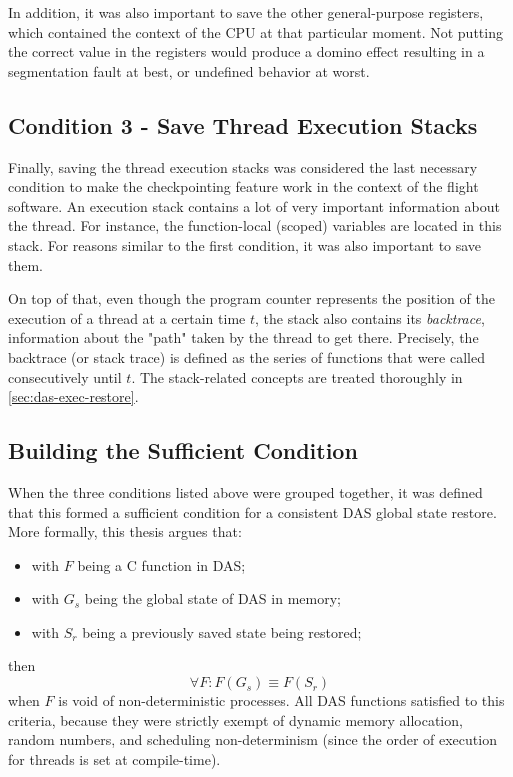 {In addition, it was also important to save the other general-purpose registers, which contained the context of the CPU at that particular moment. Not putting the correct value in the registers would produce a domino effect resulting in a segmentation fault at best, or undefined behavior at worst.

\subsection*{Condition 3 - Save Thread Execution Stacks}
Finally, saving the thread execution stacks was considered the last necessary condition to make the checkpointing feature work in the context of the flight software. An execution stack contains a lot of very important information about the thread. For instance, the function-local (scoped) variables are located in this stack. For reasons similar to the first condition, it was also important to save them.

On top of that, even though the program counter represents the position of the execution of a thread at a certain time $t$, the stack also contains its \textit{backtrace}, information about the "path" taken by the thread to get there. Precisely, the backtrace (or stack trace) is defined as the series of functions that were called consecutively until $t$. The stack-related concepts are treated thoroughly in \autoref{sec:das-exec-restore}.

\subsection*{Building the Sufficient Condition}
When the three conditions listed above were grouped together, it was defined that this formed a sufficient condition for a consistent DAS global state restore. More formally, this thesis argues that:
\begin{itemize}
	\item with $F$ being a C function in DAS;
	\item with $G_s$ being the global state of DAS in memory;
	\item with $S_r$ being a previously saved state being restored;
\end{itemize}
then
\begin{equation} \label{eq:sr_equiv}
	\forall F: F(G_s)\equiv F(S_r)
\end{equation}
when $F$ is void of non-deterministic processes. All DAS functions satisfied to this criteria, because they were strictly exempt of dynamic memory allocation, random numbers, and scheduling non-determinism (since the order of execution for threads is set at compile-time).

}
